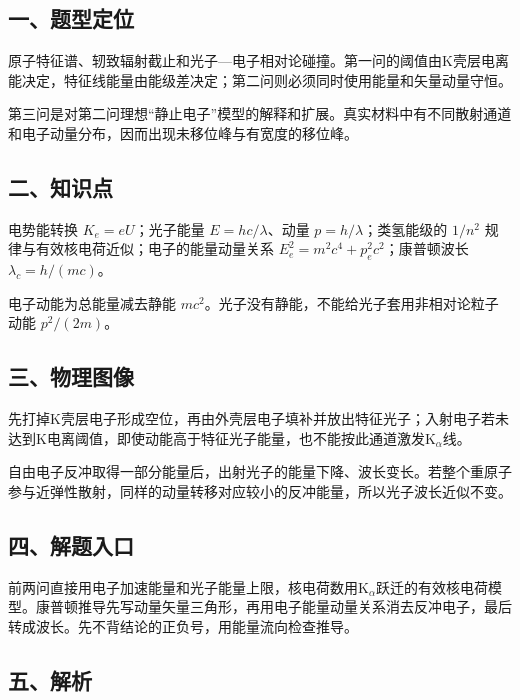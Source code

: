 \documentclass[12pt,a4paper,fontset=fandol]{ctexart}
\begin{document}
\subsection{一、题型定位}\label{ux4e00ux9898ux578bux5b9aux4f4d-7}

原子特征谱、轫致辐射截止和光子---电子相对论碰撞。第一问的阈值由K壳层电离能决定，特征线能量由能级差决定；第二问则必须同时使用能量和矢量动量守恒。

第三问是对第二问理想``静止电子''模型的解释和扩展。真实材料中有不同散射通道和电子动量分布，因而出现未移位峰与有宽度的移位峰。

\subsection{二、知识点}\label{ux4e8cux77e5ux8bc6ux70b9-7}

电势能转换 \(K_e=eU\)；光子能量 \(E=hc/\lambda\)、动量
\(p=h/\lambda\)；类氢能级的 \(1/n^2\)
规律与有效核电荷近似；电子的能量动量关系
\(E_e^2=m^2c^4+p_e^2c^2\)；康普顿波长 \(\lambda_c=h/(mc)\)。

电子动能为总能量减去静能
\(mc^2\)。光子没有静能，不能给光子套用非相对论粒子动能 \(p^2/(2m)\)。

\subsection{三、物理图像}\label{ux4e09ux7269ux7406ux56feux50cf-7}

先打掉K壳层电子形成空位，再由外壳层电子填补并放出特征光子；入射电子若未达到K电离阈值，即使动能高于特征光子能量，也不能按此通道激发K\(_\alpha\)线。

自由电子反冲取得一部分能量后，出射光子的能量下降、波长变长。若整个重原子参与近弹性散射，同样的动量转移对应较小的反冲能量，所以光子波长近似不变。

\subsection{四、解题入口}\label{ux56dbux89e3ux9898ux5165ux53e3-7}

前两问直接用电子加速能量和光子能量上限，核电荷数用K\(_\alpha\)跃迁的有效核电荷模型。康普顿推导先写动量矢量三角形，再用电子能量动量关系消去反冲电子，最后转成波长。先不背结论的正负号，用能量流向检查推导。

\subsection{五、解析}\label{ux4e94ux89e3ux6790-7}
\end{document}
